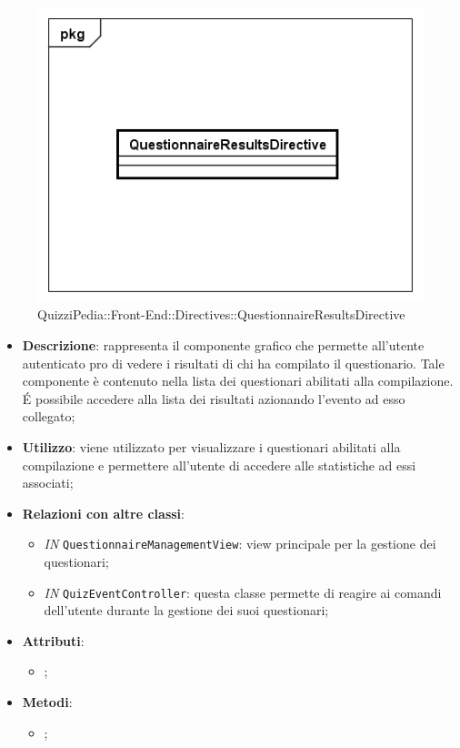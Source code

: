 \begin{figure}[ht]
	\centering
	\includegraphics[scale=0.5,keepaspectratio]{UML/Classi/Front-End/QuizziPedia_Front-end_Directives_QuestionnaireResultsDirective.png}
	\caption{QuizziPedia::Front-End::Directives::QuestionnaireResultsDirective}
\end{figure} \FloatBarrier

\begin{itemize}
	\item \textbf{Descrizione}: rappresenta il componente grafico che permette all'utente autenticato pro di vedere i risultati di chi ha compilato il questionario. Tale componente è contenuto nella lista dei questionari abilitati alla compilazione. \'E possibile accedere alla lista dei risultati azionando l'evento ad esso collegato;
	\item \textbf{Utilizzo}: viene utilizzato per visualizzare i questionari abilitati alla compilazione e permettere all'utente di accedere alle statistiche ad essi associati;
	\item \textbf{Relazioni con altre classi}: 
	\begin{itemize}
		\item \textit{IN} \texttt{QuestionnaireManagementView}: view principale per la gestione dei questionari; 
		\item \textit{IN} \texttt{QuizEventController}: questa classe permette di reagire ai comandi dell'utente durante la gestione dei suoi questionari;
	\end{itemize}
	\item \textbf{Attributi}: 
	\begin{itemize}
		\item ;
	\end{itemize}
	\item \textbf{Metodi}: 
	\begin{itemize}
		\item ;
	\end{itemize}
\end{itemize}
